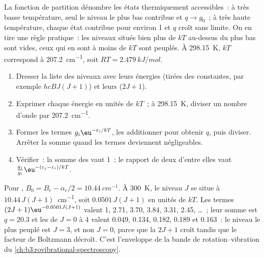 La fonction de partition dénombre les états thermiquement accessibles~:
à très basse température, seul le niveau le plus bas contribue et
$q \to g_0$~; à très haute température, chaque état contribue pour
environ 1 et $q$ croît sans limite. On en tire une règle pratique~: les
niveaux situés bien plus de $kT$ au-dessus du plus bas sont vides, ceux
qui en sont à moins de $kT$ sont peuplés. À \qty{298.15}{K}, $kT$
correspond à \qty{207.2}{cm^{-1}}, soit $RT = \qty{2.479}{kJ/mol}$.

\begin{method}\label{met:b3:partition-functions:populations}
\begin{enumerate}
  \item Dresser la liste des niveaux avec leurs énergies (tirées des
        constantes, par exemple
        $hcBJ(J+1)$) et leurs  ($2J + 1$).
  \item Exprimer chaque énergie en unités de $kT$~; à \qty{298.15}{K},
        diviser un nombre d'onde par \qty{207.2}{cm^{-1}}.
  \item Former les termes $g_i\eu^{-\varepsilon_i/kT}$, les additionner
        pour obtenir $q$, puis diviser.
        Arrêter la somme quand les termes deviennent négligeables.
  \item Vérifier~: la somme des  vaut 1~; le rapport de deux
        d'entre elles vaut
        $\frac{g_j}{g_i}\eu^{-(\varepsilon_j-\varepsilon_i)/kT}$.
\end{enumerate}
\end{method}

\begin{example}\label{ex:b3:partition-functions:hcl}
Pour , $B_0 = B_e - \alpha_e/2 = \qty{10.44}{cm^{-1}}$. À
\qty{300}{K}, le niveau $J$
se situe à $10.44\,J(J+1)$~\unit{cm^{-1}}, soit $0.0501\,J(J+1)$ en
unités de $kT$. Les termes
$(2J+1)\eu^{-0.0501J(J+1)}$ valent 1, 2.71, 3.70, 3.84, 3.31, 2.45,
\dots~; leur somme est
$q = 20.3$ et les  de $J = 0$ à 4 valent 0.049, 0.134, 0.182,
0.189 et
0.163~: le niveau le plus peuplé est $J = 3$, et non $J = 0$, parce que
la 
$2J + 1$ croît tandis que le facteur de Boltzmann décroît. C'est
l'enveloppe de la bande de rotation--vibration du
\cref{ch:b3:rovibrational-spectroscopy}.
\end{example}

